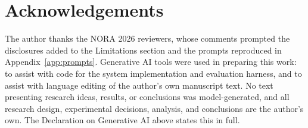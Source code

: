 \documentclass[11pt]{article}
\begin{document}
\section*{Acknowledgements}

The author thanks the NORA 2026 reviewers, whose comments prompted the disclosures added to the Limitations section and the prompts reproduced in Appendix~\ref{app:prompts}. Generative AI tools were used in preparing this work: to assist with code for the system implementation and evaluation harness, and to assist with language editing of the author's own manuscript text. No text presenting research ideas, results, or conclusions was model-generated, and all research design, experimental decisions, analysis, and conclusions are the author's own. The Declaration on Generative AI above states this in full.
\end{document}

